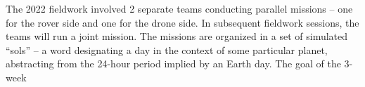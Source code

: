 The 2022 fieldwork involved 2 separate teams
conducting parallel missions -- one for the rover side and one for the drone side.
In subsequent fieldwork sessions, the teams will run a joint mission.
The missions are organized in a set of simulated ``sols'' -- a word designating a day in the context
of some particular planet, abstracting from the 24-hour period implied by an Earth day.
The goal of the 3-week 
